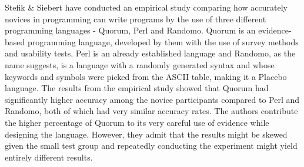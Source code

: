 Stefik \& Siebert  have conducted an empirical study comparing how accurately novices in programming can write programs by the use of three different programming languages - Quorum, Perl and Randomo. Quorum is an evidence-based programming language, developed by them with the use of survey methods and usability tests, Perl is an already established language and Randomo, as the name suggests, is a language with a randomly generated syntax and whose keywords and symbols were picked from the ASCII table, making it a Placebo language. The results from the empirical study showed that Quorum had significantly higher accuracy among the novice participants compared to Perl and Randomo, both of which had very similar accuracy rates. The authors contribute the higher percentage of Quorum to its very careful use of evidence while designing the language. However, they admit that the results might be skewed given the small test group and repeatedly conducting the experiment might yield entirely different results.






   